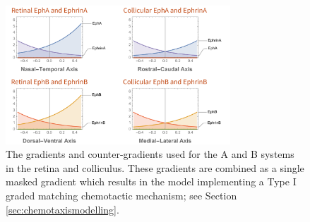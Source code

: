 \begin{figure}[h]
	\centering
	\includegraphics[width=0.75\textwidth]{images/distributed_kernels/figure_cartoongradients}
	\def\c{The gradients and counter-gradients used for the A and B systems in the retina and colliculus. }
	\caption[\c]{\label{fig:cartoongradients} \c These gradients are combined as a single masked gradient which results in the model implementing a Type I graded matching chemotactic mechanism; see Section \ref{sec:chemotaxismodelling}.}
\end{figure}
